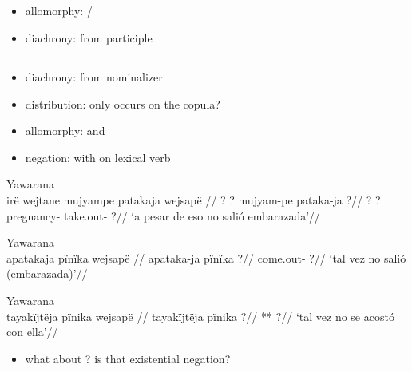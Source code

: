 \documentclass{memoir}
\begin{document}
\subsection{\texorpdfstring{}{}}

\begin{itemize}
\tightlist
\item
  allomorphy: /
\item
  diachrony: from participle 
\end{itemize}

\subsection{\texorpdfstring{}{}}

\begin{itemize}
\tightlist
\item
  diachrony: from nominalizer 
\item
  distribution: only occurs on the copula?
\item
  allomorphy:  and 
\item
  negation: with  on lexical verb
\end{itemize}

\ex Yawarana \\
\label{ctoaragrme-38}    \begingl
    \glpreamble  irë wejtane mujyampe patakaja wejsapë //
    \gla ? ? mujyam-pe pataka-ja ?//
    \glb ? ? pregnancy- take.out- ?//
        \glft ‘a pesar de eso no salió embarazada’//  
    \endgl 
\xe

\ex Yawarana \\
\label{ctoaragrme-39}    \begingl
    \glpreamble  apatakaja pïnïka wejsapë //
    \gla apataka-ja pïnïka ?//
    \glb come.out-  ?//
        \glft ‘tal vez no salió (embarazada)’//  
    \endgl 
\xe

\ex Yawarana \\
\label{ctoaragrme-40}    \begingl
    \glpreamble  tayakïjtëja pïnika wejsapë //
    \gla tayakïjtëja pïnika ?//
    \glb ***  ?//
        \glft ‘tal vez no se acostó con ella’//  
    \endgl 
\xe

\begin{itemize}
\tightlist
\item
  what about ? is that existential negation?
\end{itemize}
\end{document}
